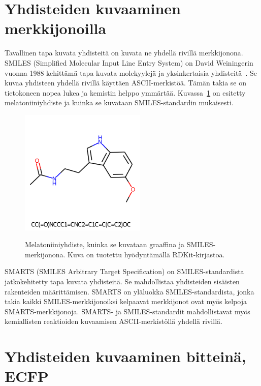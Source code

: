 \documentclass[finnish,twoside,censored,tkt,sw-line]{HYthesisML}
\begin{document}
\section{Yhdisteiden kuvaaminen merkkijonoilla}

Tavallinen tapa kuvata yhdisteitä on kuvata ne yhdellä rivillä merkkijonona.
SMILES (Simplified Molecular Input Line Entry System) on David Weiningerin vuonna 1988 kehittämä tapa kuvata molekyylejä ja yksinkertaisia yhdisteitä~\cite{WeiningerSMILES}.
Se kuvaa yhdisteen yhdellä rivillä käyttäen ASCII-merkistöä.
Tämän takia se on tietokoneen nopea lukea ja kemistin helppo ymmärtää.
Kuvassa~\ref{fig:melatonin} on esitetty melatoniiniyhdiste ja kuinka se kuvataan SMILES-standardin mukaisesti.

\begin{figure}[!ht]
    \centering
    \includegraphics[width=6cm, height=6cm]{melatonin-smiles.png}
    \caption{Melatoniiniyhdiste, kuinka se kuvataan graaffina ja SMILES-merkijonona.
        Kuva on tuotettu hyödyntämällä RDKit-kirjastoa.}
    {\label{fig:melatonin}}
\end{figure}

SMARTS (SMILES Arbitrary Target Specification) on SMILES-standardista jatkokehitetty tapa kuvata yhdisteitä.
Se mahdollistaa yhdisteiden sisäisten rakenteiden määrittämisen.
SMARTS on yläluokka SMILES-standardista, jonka takia kaikki SMILES-merkkijonoiksi kelpaavat merkkijonot ovat myös kelpoja SMARTS-merkkijonoja.
SMARTS- ja SMILES-standardit mahdollistavat myös kemiallisten reaktioiden kuvaamisen ASCII-merkistöllä yhdellä rivillä.

\section{Yhdisteiden kuvaaminen bitteinä, ECFP}
\end{document}
